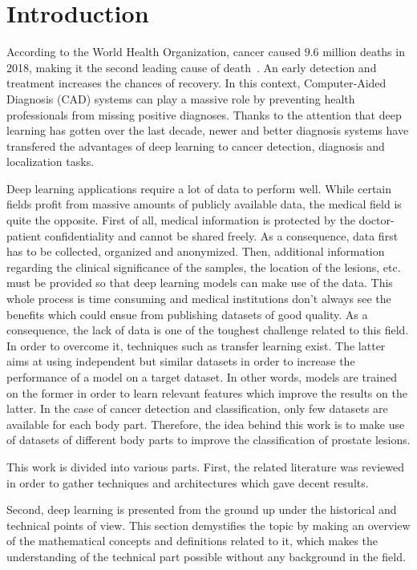 
\chapter{Introduction}
\label{ch:introduction}

According to the World Health Organization, cancer caused $9.6$ million deaths in 2018, making it the second leading cause of death~\cite{44}. An early detection and treatment increases the chances of recovery. In this context, Computer-Aided Diagnosis (CAD) systems can play a massive role by preventing health professionals from missing positive diagnoses. Thanks to the attention that deep learning has gotten over the last decade, newer and better diagnosis systems have transfered the advantages of deep learning to cancer detection, diagnosis and localization tasks.

Deep learning applications require a lot of data to perform well. While certain fields profit from massive amounts of publicly available data, the medical field is quite the opposite. First of all, medical information is protected by the doctor-patient confidentiality and cannot be shared freely. As a consequence, data first has to be collected, organized and anonymized. Then, additional information regarding the clinical significance of the samples, the location of the lesions, etc. must be provided so that deep learning models can make use of the data. This whole process is time consuming and medical institutions don't always see the benefits which could ensue from publishing datasets of good quality. As a consequence, the lack of data is one of the toughest challenge related to this field. In order to overcome it, techniques such as transfer learning exist. The latter aims at using independent but similar datasets in order to increase the performance of a model on a target dataset. In other words, models are trained on the former in order to learn relevant features which improve the results on the latter. In the case of cancer detection and classification, only few datasets are available for each body part. Therefore, the idea behind this work is to make use of datasets of different body parts to improve the classification of prostate lesions.

This work is divided into various parts. First, the related literature was reviewed in order to gather techniques and architectures which gave decent results.

Second, deep learning is presented from the ground up under the historical and technical points of view. This section demystifies the topic by making an overview of the mathematical concepts and definitions related to it, which makes the understanding of the technical part possible without any background in the field.

